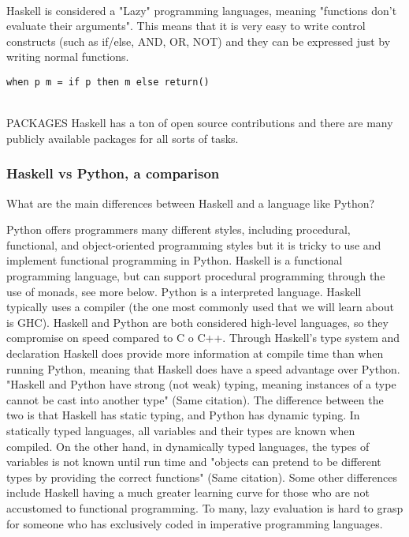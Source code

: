 \documentclass{article}
\begin{document}
\\
Haskell is considered a "Lazy" programming languages, meaning "functions don't evaluate their arguments". This means that it is very easy to write control constructs (such as if/else, AND, OR, NOT) and they can be expressed just by writing normal functions.
\\
\begin{lstlisting}
when p m = if p then m else return()
\end{lstlisting}
\\
PACKAGES
Haskell has a ton of open source contributions and there are many publicly available packages for all sorts of tasks.

\subsubsection{Haskell vs Python, a comparison}
What are the main differences between Haskell and a language like Python?


Python offers programmers many different styles, including procedural, functional, and object-oriented programming styles \cite{WinNT} but it is tricky to use and implement functional programming in Python. Haskell is  a functional programming language, but can support procedural programming through the use of monads, see more below.
Python is a interpreted language. Haskell typically uses a compiler (the one most commonly used that we will learn about is GHC). Haskell and Python are both considered high-level languages, so they compromise on speed compared to C o C++. Through Haskell's type system and declaration Haskell does provide more information at compile time than when running Python, meaning that Haskell does have a speed advantage over Python. "Haskell and Python have strong (not weak) typing, meaning instances of a type cannot be cast into another type" (Same citation). The difference between the two is that Haskell has static typing, and Python has dynamic typing. In statically typed languages, all variables and their types are known when compiled. On the other hand, in dynamically typed languages, the types of variables is not known until run time and "objects can pretend to be different types by providing the correct functions" (Same citation). Some other differences include Haskell having a much greater learning curve for those who are not accustomed to functional programming. To many, lazy evaluation is hard to grasp for someone who has exclusively coded in imperative programming languages.
\end{document}
